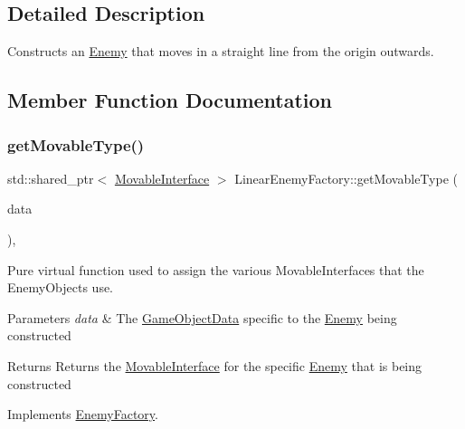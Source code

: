 \subsection{Detailed Description}
Constructs an \hyperlink{class_enemy}{Enemy} that moves in a straight line from the origin outwards. 

\subsection{Member Function Documentation}
\mbox{\label{class_linear_enemy_factory_ad8b2931b7f31f9f8e13d3c9d804469bf}} 
\subsubsection{\texorpdfstring{get\+Movable\+Type()}{getMovableType()}}
{\footnotesize\ttfamily std\+::shared\+\_\+ptr$<$ \hyperlink{class_movable_interface}{Movable\+Interface} $>$ Linear\+Enemy\+Factory\+::get\+Movable\+Type (\begin{DoxyParamCaption}\item[{const \hyperlink{struct_game_object_data}{Game\+Object\+Data} \&}]{data }\end{DoxyParamCaption})\hspace{0.3cm}{\ttfamily [override]}, {\ttfamily [virtual]}}



Pure virtual function used to assign the various Movable\+Interfaces that the Enemy\+Objects use. 


\begin{DoxyParams}{Parameters}
{\em data} & The \hyperlink{struct_game_object_data}{Game\+Object\+Data} specific to the \hyperlink{class_enemy}{Enemy} being constructed \\
\hline
\end{DoxyParams}
\begin{DoxyReturn}{Returns}
Returns the \hyperlink{class_movable_interface}{Movable\+Interface} for the specific \hyperlink{class_enemy}{Enemy} that is being constructed 
\end{DoxyReturn}


Implements \hyperlink{class_enemy_factory_ae064082d650e676960cb84ebb60ba216}{Enemy\+Factory}.

